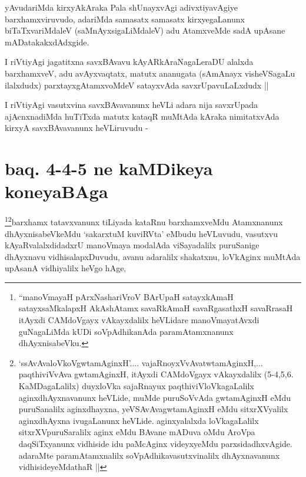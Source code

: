 
\begin{artha}
yAvudariMda kirxyAkAraka Pala shUnayxvAgi adivxtiyavAgiye
barxhamxviruvudo, adariMda samasatx samasatx kirxyegaLanunx
biTaTxvariMdaleV (saMnAyxsigaLiMdaleV) adu AtamxveMde sadA upAsane mADatakakxdAdxgide. 
\end{artha}

\begin{artha}
I riVtiyAgi jagatitxna savxBAvavu kAyARkAraNagaLeraDU alalxda
barxhamxveV,  adu avAyxvaqtatx, matutx ananugata (sAmAnayx
visheVSagaLu ilalxdudx) parxtayxgAtamxvoMdeV satayxvAda
savxrUpavuLaLxdudx ||
\end{artha}


\begin{artha}
I riVtiyAgi vasutxvina savxBAvavanunx heVLi adara nija savxrUpada
ajAcnxnadiMda huTiTxda matutx kataqR muMtAda kAraka nimitatxvAda
kirxyA savxBAvavanunx heVLiruvudu -
\end{artha}

\section*{baq. 4-4-5 ne kaMDikeya koneyaBAga}

\stext

\begin{artha}
\footnote{``manoVmayaH pArxNashariVroV BArUpaH satayxkAmaH
  satayxsaMkalapxH AkAshAtamx savaRkAmaH savaRgasathxH savaRrasaH
  itAyxdi CAMdoVgayx vAkayxdalilx heVLidare manoVmayatAvxdi
  guNagaLiMda kUDi soVpAdhikanAda paramAtamxnanunx
  dhAyxnisabeVku.}\footnote{`ssAvAvaloVkoVgwtamAginxH'.... vajaRnoyxVvAvatwtamAginxH,... paqthiviVvAva
gwtamAginxH, itAyxdi CAMdoVgayx vAkayxdalilx (5-4,5,6. KaMDagaLalilx)
duyxloVka sajaRnayux paqthiviVloVkagaLalilx aginxdhAyxnavanunx
heVLide, muMde puruSoVvAda gwtamAginxH eMdu puruSanalilx aginxdhayxna,
yeVSAvAvagwtamAginxH eMdu sitxrXVyalilx aginxdhAyxna ivugaLanunx
heVLide. aginxyalalxda loVkagaLalilx sitxrXVpuruSaralilx aginx eMdu
BAvane mADuva oMdu AroVpa daqSiTxyanunx vidhiside idu paMcAginx
videyxyeMdu parxsidadhxvAgide. adaraMte paramAtamxnalilx
soVpAdhikavasutxvinalilx dhAyxnavanunx vidhisideyeMdathaR ||}barxhamx
tatavxvanunx tiLiyada kataRnu barxhamxveMdu
Atamxnanunx dhAyxnisabeVkeMdu `sakarxtuM kuviRVta' eMbudu heVLuvudu,
vasutxvu kAyaRvalalxdidadxrU manoVmaya modalAda viSayadalilx
puruSanige dhAyxnavu vidhisalapxDuvudu, avanu adaralilx shakatxnu,
loVkAginx muMtAda upAsanA vidhiyalilx heVgo hAge, 
\end{artha}

